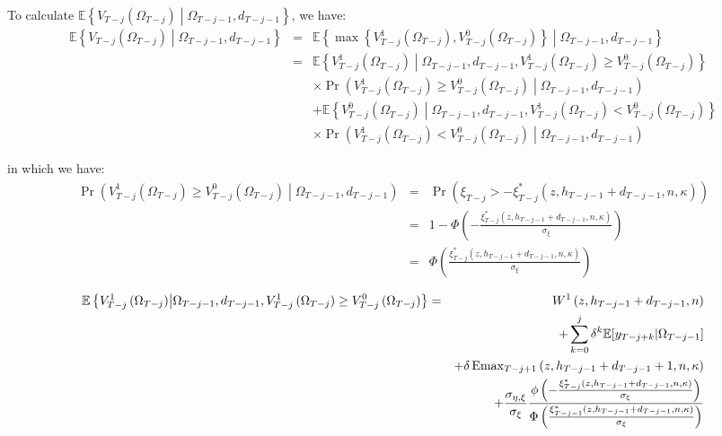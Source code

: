\indent To calculate $\mathbb{E} \left\{ V_{T-j}\left(\Omega_{T-j}\right) \middle| \Omega_{T-j-1}, d_{T-j-1}\right\}$, we have:
\begin{eqnarray}
\mathbb{E} \left\{ V_{T-j}\left(\Omega_{T-j}\right) \middle| \Omega_{T-j-1}, d_{T-j-1}\right\} &=& \mathbb{E} \left\{ \max\left\{ V^{1}_{T-j}\left(\Omega_{T-j}\right), V^{0}_{T-j}\left(\Omega_{T-j}\right) \right\} \middle| \Omega_{T-j-1}, d_{T-j-1} \right\} \nonumber \\
&=& \mathbb{E} \left\{ V^{1}_{T-j}\left(\Omega_{T-j}\right) \middle| \Omega_{T-j-1}, d_{T-j-1}, V^{1}_{T-j}\left(\Omega_{T-j}\right) \geq V^{0}_{T-j}\left(\Omega_{T-j}\right) \right\} \nonumber \\
& & \times \Pr\left(V^1_{T-j}\left(\Omega_{T-j}\right) \geq V^0_{T-j}\left(\Omega_{T-j}\right) \middle| \Omega_{T-j-1}, d_{T-j-1} \right) \nonumber \\
& & + \mathbb{E} \left\{ V^{0}_{T-j}\left(\Omega_{T-j}\right) \middle| \Omega_{T-j-1}, d_{T-j-1}, V^{1}_{T-j}\left(\Omega_{T-j}\right) < V^{0}_{T-j}\left(\Omega_{T-j}\right) \right\} \nonumber \\
& & \times \Pr\left(V^1_{T-j}\left(\Omega_{T-j}\right) < V^0_{T-j}\left(\Omega_{T-j}\right) \middle| \Omega_{T-j-1}, d_{T-j-1} \right)
\end{eqnarray}

\noindent in which we have:
\begin{eqnarray}
\Pr\left(V^1_{T-j}\left(\Omega_{T-j}\right) \geq V^0_{T-j}\left(\Omega_{T-j}\right) \middle| \Omega_{T-j-1}, d_{T-j-1} \right) &=& \Pr \left(\xi_{T-j} > -\xi^*_{T-j}\left(z, h_{T-j-1}+d_{T-j-1}, n, \kappa \right) \right) \nonumber \\
&=& 1 - \Phi \left(-\frac{\xi^*_{T-j}\left(z, h_{T-j-1}+d_{T-j-1}, n, \kappa \right)}{\sigma_\xi}\right) \nonumber \\
&=& \Phi \left(\frac{\xi^*_{T-j}\left(z, h_{T-j-1}+d_{T-j-1}, n, \kappa \right)}{\sigma_\xi}\right)
\end{eqnarray}

\begin{eqnarray}
\mathbb{E} \left\{ V^{1}_{T-j}\left(\Omega_{T-j}\right) \middle| \Omega_{T-j-1}, d_{T-j-1}, V^{1}_{T-j}\left(\Omega_{T-j}\right) \geq V^{0}_{T-j}\left(\Omega_{T-j}\right) \right\} &=& W^{1} \left(z, h_{T-j-1} + d_{T-j-1}, n \right) \nonumber \\
& & + \sum_{k=0}^{j} \delta^{k} \mathbb{E} [y_{T-j+k} | \Omega_{T-j-1}] \nonumber \\
& & + \delta \operatorname{Emax}_{T-j+1} \left(z, h_{T-j-1} + d_{T-j-1} + 1, n, \kappa \right) \nonumber \\
& & + \frac{\sigma_{\eta, \xi}}{\sigma_\xi} \frac{\phi\left(-\frac{\xi^*_{T-j}\left(z, h_{T-j-1}+d_{T-j-1}, n, \kappa \right)}{\sigma_\xi} \right)}{\Phi\left( \frac{\xi^*_{T-j-1}\left(z, h_{T-j-1}+d_{T-j-1}, n, \kappa \right)}{\sigma_\xi}\right)}   
\end{eqnarray}
 
